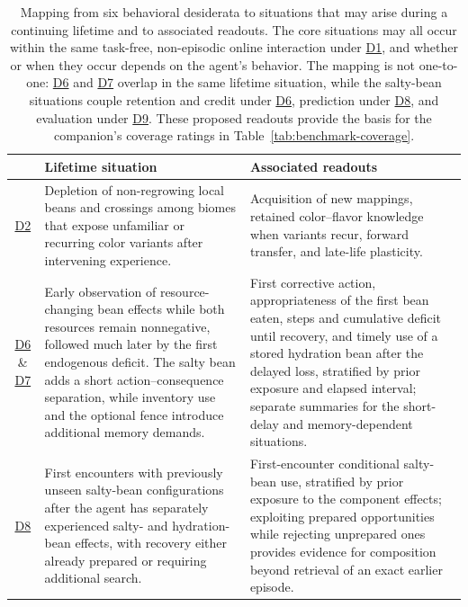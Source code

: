\documentclass[10pt,journal,compsoc]{IEEEtran}
\DeclareRobustCommand{\Dref}[1]{\hyperref[sec:d#1]{D#1}}
\begin{document}
\begin{table}[!t]
    \caption{Mapping from six behavioral desiderata to situations that may arise during a continuing lifetime and to associated readouts.
    The core situations may all occur within the same task-free, non-episodic online interaction under \Dref{1}, and whether or when they occur depends on the agent's behavior.
    The mapping is not one-to-one: \Dref{6} and \Dref{7} overlap in the same lifetime situation, while the salty-bean situations couple retention and credit under \Dref{6}, prediction under \Dref{8}, and evaluation under \Dref{9}.
    These proposed readouts provide the basis for the companion's coverage ratings in Table~\ref{tab:benchmark-coverage}.}
    \label{tab:companion-diagnostics}
    \centering
    \renewcommand{\arraystretch}{1.2}
    \begin{tabularx}{\textwidth}{
        @{}
        c
        >{\raggedright\arraybackslash}p{}
        >{\raggedright\arraybackslash}X
        @{}
    }
        \toprule
        & \textbf{Lifetime situation} & \textbf{Associated readouts} \\
        \midrule
        \Dref{2} & Depletion of non-regrowing local beans and crossings among biomes that expose unfamiliar or recurring color variants after intervening experience. & Acquisition of new mappings, retained color--flavor knowledge when variants recur, forward transfer, and late-life plasticity. \\
        \Dref{6} \& \Dref{7} & Early observation of resource-changing bean effects while both resources remain nonnegative, followed much later by the first endogenous deficit. The salty bean adds a short action--consequence separation, while inventory use and the optional fence introduce additional memory demands. & First corrective action, appropriateness of the first bean eaten, steps and cumulative deficit until recovery, and timely use of a stored hydration bean after the delayed loss, stratified by prior exposure and elapsed interval; separate summaries for the short-delay and memory-dependent situations. \\
        \Dref{8} & First encounters with previously unseen salty-bean configurations after the agent has separately experienced salty- and hydration-bean effects, with recovery either already prepared or requiring additional search. & First-encounter conditional salty-bean use, stratified by prior exposure to the component effects; exploiting prepared opportunities while rejecting unprepared ones provides evidence for composition beyond retrieval of an exact earlier episode. \\

\end{tabularx}
\end{table}
\end{document}
